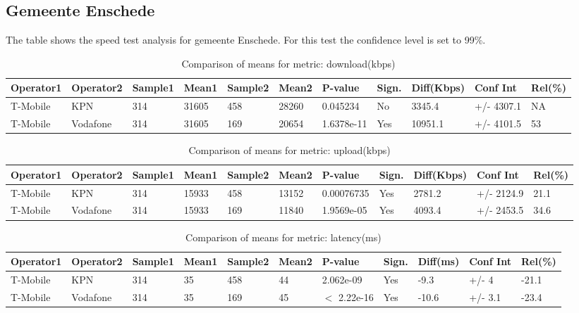 \documentclass[]{article}
\begin{document}
\normalsize

\newpage

\subsection{Gemeente Enschede}\label{gemeente-enschede}

The table shows the speed test analysis for gemeente Enschede. For this
test the confidence level is set to 99\%.

\begin{table}[ht]
\centering
{\footnotesize
\begin{tabular}{lllllllllll}
  \hline
Operator1 & Operator2 & Sample1 & Mean1 & Sample2 & Mean2 & P-value & Sign. & Diff(Kbps) & Conf Int & Rel(\%) \\ 
  \hline
T-Mobile & KPN & 314 & 31605 & 458 & 28260 & 0.045234 & No & 3345.4 & +/- 4307.1 & NA \\ 
  T-Mobile & Vodafone & 314 & 31605 & 169 & 20654 & 1.6378e-11 & Yes & 10951.1 & +/- 4101.5 & 53 \\ 
   \hline
\end{tabular}
}
\caption{Comparison of means for metric: download(kbps)} 
\end{table}\begin{table}[ht]
\centering
{\footnotesize
\begin{tabular}{lllllllllll}
  \hline
Operator1 & Operator2 & Sample1 & Mean1 & Sample2 & Mean2 & P-value & Sign. & Diff(Kbps) & Conf Int & Rel(\%) \\ 
  \hline
T-Mobile & KPN & 314 & 15933 & 458 & 13152 & 0.00076735 & Yes & 2781.2 & +/- 2124.9 & 21.1 \\ 
  T-Mobile & Vodafone & 314 & 15933 & 169 & 11840 & 1.9569e-05 & Yes & 4093.4 & +/- 2453.5 & 34.6 \\ 
   \hline
\end{tabular}
}
\caption{Comparison of means for metric: upload(kbps)} 
\end{table}\begin{table}[ht]
\centering
{\footnotesize
\begin{tabular}{lllllllllll}
  \hline
Operator1 & Operator2 & Sample1 & Mean1 & Sample2 & Mean2 & P-value & Sign. & Diff(ms) & Conf Int & Rel(\%) \\ 
  \hline
T-Mobile & KPN & 314 & 35 & 458 & 44 & 2.062e-09 & Yes & -9.3 & +/- 4 & -21.1 \\ 
  T-Mobile & Vodafone & 314 & 35 & 169 & 45 & $<$ 2.22e-16 & Yes & -10.6 & +/- 3.1 & -23.4 \\ 
   \hline
\end{tabular}
}
\caption{Comparison of means for metric: latency(ms)} 
\end{table}
\end{document}
